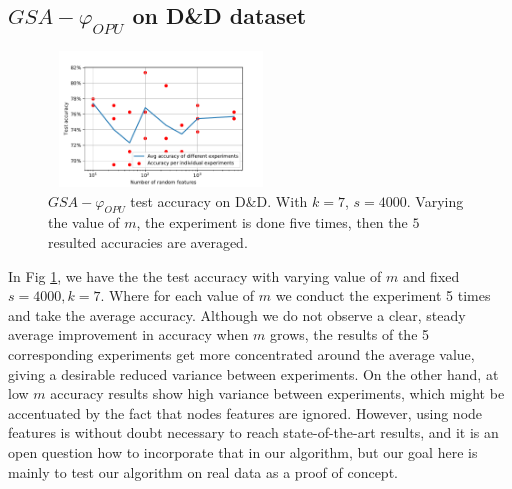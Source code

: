 \documentclass{article}
\begin{document}
\subsection{$GSA-\varphi_{OPU}$ on D\&D dataset}
\begin{figure}[htb]
\begin{minipage}[b]{1.0\linewidth}
  \centering
  \centerline{\includegraphics[width=6cm,height=3.6cm]{figs/DD.pdf}}
\end{minipage}
\caption{$GSA-\varphi_{OPU}$ test accuracy on D\&D. With  $k=7$, $s=4000$. Varying the value of $m$, the experiment is done five times, then the $5$ resulted accuracies are averaged.}
\label{fig:DD}
%
\end{figure}
In Fig \ref{fig:DD}, we have the the test accuracy with varying value of $m$ and fixed $s=4000 , k=7$. Where for each value of $m$ we conduct the experiment 5 times and take the average accuracy. Although we do not observe a clear, steady average improvement in accuracy when $m$ grows, the results of the 5 corresponding experiments get more concentrated around the average value, giving a desirable reduced variance between experiments. On the other hand, at low $m$ accuracy results show high variance between experiments, which might be accentuated by the fact that nodes features are ignored. However, using node features is without doubt necessary to reach state-of-the-art results, and it is an open question how to incorporate that in our algorithm, but our goal here is mainly to test our algorithm on real data as a proof of concept.


\end{document}
